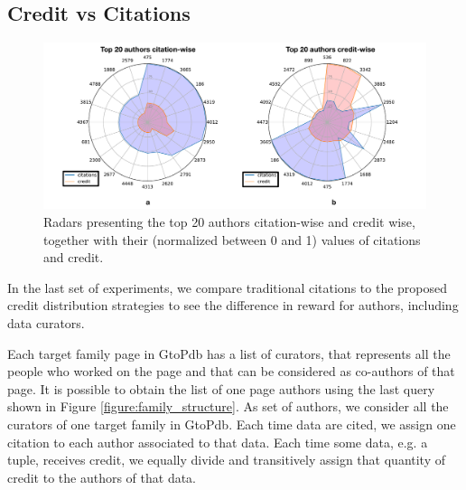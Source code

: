
\subsection{Credit vs Citations}

\begin{figure}[]
\centering
  \includegraphics[width=1\textwidth]{figures/2_radars}
  \caption{Radars presenting the top 20 authors citation-wise and credit wise, together with their (normalized between 0 and 1) values of citations and credit.}
  \label{figure:2_radars}
\end{figure}


In the last set of experiments, we compare traditional citations to the proposed credit distribution strategies to see the difference in reward for authors, including data curators.  

Each target family page in GtoPdb has a list of curators, that represents all the people who worked on the page and that can be considered as co-authors of that page. It is possible to obtain the list of one page authors using the last query shown in Figure \ref{figure:family_structure}. As set of authors, we consider all the curators of one target family in GtoPdb. 
Each time data are cited, we assign one citation to each author associated to that data. Each time some data, e.g. a tuple, receives credit, we equally divide and transitively assign that quantity of credit to the authors of that data.


